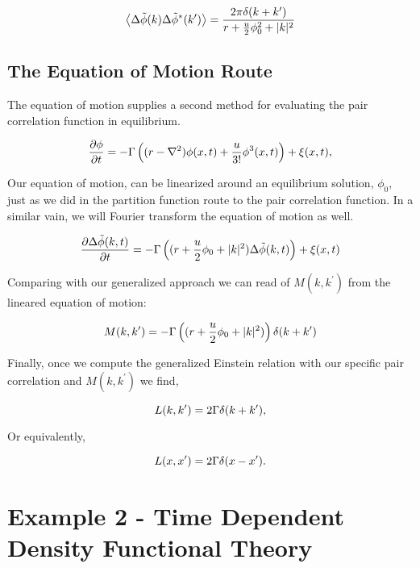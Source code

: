 \begin{equation}
\left\langle \Delta\tilde{\phi}(k)\Delta\tilde{\phi}^{*}(k^\prime) \right\rangle = \frac{2\pi \delta(k+k^\prime)}{r + \frac{u}{2}\phi_0^2 + \vert k \vert^2}
\end{equation}

\subsection{The Equation of Motion Route}

The equation of motion supplies a second method for evaluating the pair correlation function in equilibrium.

\begin{equation}
\frac{\partial \phi}{\partial t} = -\Gamma\left((r-\nabla^2)\phi(x,t) + \frac{u}{3!}\phi^3(x,t)\right) + \xi(x, t),
\end{equation}

Our equation of motion, can be linearized around an equilibrium solution, $\phi_0$, just as we did in the partition function route to the pair correlation function. In a similar vain, we will Fourier transform the equation of motion as well.

\begin{equation}
\frac{\partial \Delta\tilde{\phi}(k, t)}{\partial t} = -\Gamma\left((r + \frac{u}{2}\phi_0 + \vert k \vert^2)\Delta\tilde{\phi}(k,t)\right) + \xi(x,t)
\end{equation}

Comparing with our generalized approach we can read of $M(k, k^\prime)$ from the lineared equation of motion:

\begin{equation}
	M(k, k^\prime) = -\Gamma\left((r + \frac{u}{2}\phi_0 + \vert k \vert^2)\right)\delta(k + k^\prime)
\end{equation}

Finally, once we compute the generalized Einstein relation with our specific pair correlation and $M(k, k^\prime)$ we find,

\begin{equation}
	L(k, k^\prime) = 2\Gamma \delta(k + k^\prime),
\end{equation}

Or equivalently,

\begin{equation}
	L(x, x^\prime) = 2\Gamma \delta(x - x^\prime).
\end{equation}

\section{Example 2 - Time Dependent Density Functional Theory}

